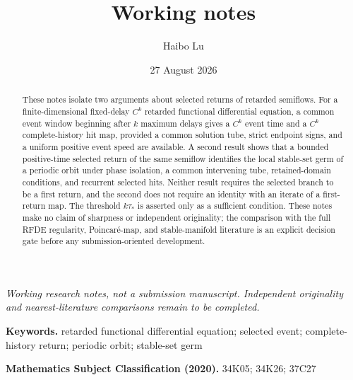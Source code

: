 \documentclass[11pt]{article}
\title{\papertitle\\[0.4em]
  \large Working notes}
\author{Haibo Lu}
\date{27 August 2026}
\begin{document}
\maketitle

\begin{center}
\small\color{StatusRed}\itshape
Working research notes, not a submission manuscript.  Independent
originality and nearest-literature comparisons remain to be completed.
\end{center}

\begin{abstract}
These notes isolate two arguments about selected returns of retarded
semiflows.  For a finite-dimensional fixed-delay \(C^k\) retarded functional
differential equation, a common event window beginning after \(k\) maximum
delays gives a \(C^k\) event time and a \(C^k\) complete-history hit map,
provided a common solution tube, strict endpoint signs, and a uniform
positive event speed are available.  A second result shows that a bounded
positive-time selected return of the same semiflow identifies the local
stable-set germ of a periodic orbit under phase isolation, a common
intervening tube, retained-domain conditions, and recurrent selected hits.
Neither result requires the selected branch to be a first return, and the
second does not require an identity with an iterate of a first-return map.
The threshold \(k\tau_*\) is asserted only as a sufficient condition.  These
notes make no claim of sharpness or independent originality; the comparison
with the full RFDE regularity, Poincar\'e-map, and stable-manifold literature
is an explicit decision gate before any submission-oriented development.
\end{abstract}

\noindent\textbf{Keywords.}
retarded functional differential equation; selected event; complete-history
return; periodic orbit; stable-set germ

\medskip
\noindent\textbf{Mathematics Subject Classification (2020).}
34K05; 34K26; 37C27






\end{document}

